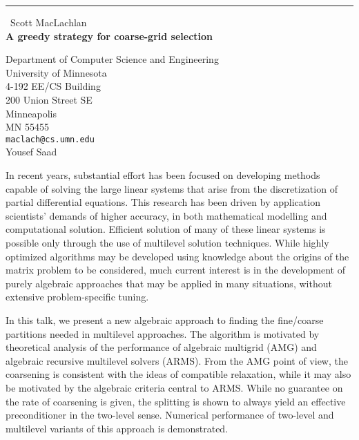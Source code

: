 \documentclass{report}
\begin{document}
\begin{center}
\rule{6in}{1pt} \
{\large Scott MacLachlan \\
{\bf A greedy strategy for coarse-grid selection}}

Department of Computer Science and Engineering \\ University of Minnesota \\ 4-192 EE/CS Building \\ 200 Union Street SE \\ Minneapolis \\ MN 55455
\\
{\tt maclach@cs.umn.edu}\\
Yousef Saad\end{center}

In recent years, substantial effort has been focused on developing
methods capable of solving the large linear systems that arise from the
discretization of partial differential equations. This research has been
driven by application scientists' demands of higher accuracy, in both
mathematical modelling and computational solution. Efficient solution of
many of these linear systems is possible only through the use of
multilevel solution techniques. While highly optimized algorithms may be
developed using knowledge about the origins of the matrix problem to be
considered, much current interest is in the development of purely
algebraic approaches that may be applied in many situations, without
extensive problem-specific tuning.

In this talk, we present a new algebraic approach to finding the
fine/coarse partitions needed in multilevel approaches. The algorithm is
motivated by theoretical analysis of the performance of algebraic
multigrid (AMG) and algebraic recursive multilevel solvers (ARMS). From
the AMG point of view, the coarsening is consistent with the ideas of
compatible relaxation, while it may also be motivated by the algebraic
criteria central to ARMS. While no guarantee on the rate of coarsening is
given, the splitting is shown to always yield an effective preconditioner
in the two-level sense. Numerical performance of two-level and multilevel
variants of this approach is demonstrated.
\end{document}
